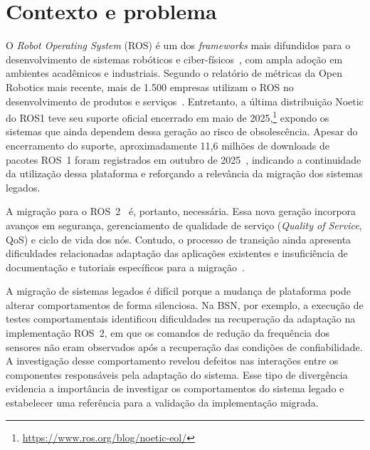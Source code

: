 \label{sec:introducao}


\section{Contexto e problema}

O \textit{Robot Operating System} (ROS) é um dos \textit{frameworks} mais difundidos para o desenvolvimento de sistemas robóticos e ciber-físicos~\cite{ros1}, com ampla adoção em ambientes acadêmicos e industriais. Segundo o relatório de métricas da Open Robotics mais recente, mais de 1.500 empresas utilizam o ROS no desenvolvimento de produtos e serviços~\cite{OpenRoboticsMetrics2025}.
Entretanto, a última distribuição Noetic do ROS1 teve seu suporte oficial encerrado em maio de 2025,\footnote{\href{https://www.ros.org/blog/noetic-eol/}{https://www.ros.org/blog/noetic-eol/}} expondo os sistemas que ainda dependem dessa geração ao risco de obsolescência. Apesar do encerramento do suporte, aproximadamente 11,6 milhões de downloads de pacotes ROS~1 foram registrados em outubro de 2025~\cite{OpenRoboticsMetrics2025}, indicando a continuidade da utilização dessa plataforma e reforçando a relevância da migração dos sistemas legados.

A migração para o ROS~2~\cite{ros2} é, portanto, necessária. Essa nova geração incorpora avanços em segurança, gerenciamento de qualidade de serviço (\textit{Quality of Service}, QoS) e ciclo de vida dos nós.
Contudo, o processo de transição ainda apresenta dificuldades relacionadas adaptação das aplicações existentes e insuficiência de documentação e tutoriais específicos para a migração~\cite{Portugal2025ROS2Adoption}.

A migração de sistemas legados é difícil porque a mudança de plataforma pode alterar comportamentos de forma silenciosa. Na BSN, por exemplo, a execução de testes comportamentais identificou dificuldades na recuperação da adaptação na implementação ROS~2, em que os comandos de redução da frequência dos sensores não eram observados após a recuperação das condições de confiabilidade. A investigação desse comportamento revelou defeitos nas interações entre os componentes responsáveis pela adaptação do sistema. Esse tipo de divergência evidencia a importância de investigar os comportamentos do sistema legado e estabelecer uma referência para a validação da implementação migrada.

